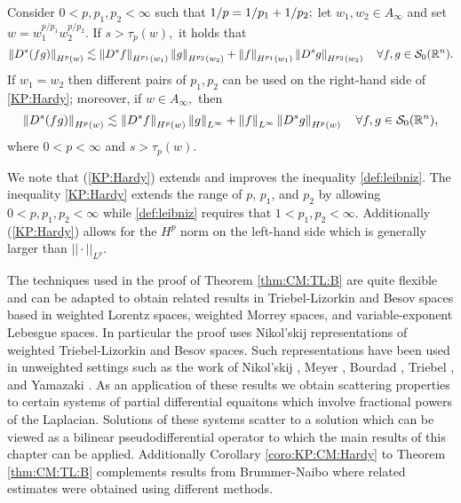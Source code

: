 \begin{corollary}\label{coro:KP:Hardy} 
Consider  $0 < p, p_1, p_2  < \infty$  such that $1/p=1/p_1+1/p_2;$ let  $w_1,w_2\in A_\infty$ and set $w=w_1^{{p}/{p_1}} w_2^{{p}/{p_2}}.$ 
If  $s > \tau_{p}(w),$ it holds that
\begin{equation}\label{KP:Hardy}
\left\|D^s(fg)\right\|_{H^p(w)} \lesssim \left\|D^s f\right\|_{H^{p_1}(w_1)} \left\|g\right\|_{H^{p_2}(w_2)} +  \left\|f\right\|_{H^{p_1}(w_1)}   \left\|D^s g\right\|_{H^{p_2}(w_2)} \quad \forall f, g \in {\mathcal{S}_0}({{\mathbb R}^n}).
\end{equation}
If $w_1=w_2$ then different pairs of $p_1, p_2$ can be used on the right-hand side of \eqref{KP:Hardy}; moreover, if $w\in A_\infty,$ then 
\begin{equation*}
\left\|D^s(fg)\right\|_{H^p(w)} \lesssim \left\|D^s f\right\|_{H^{p}(w)} \left\|g\right\|_{L^\infty} +  \left\|f\right\|_{L^\infty}   \left\|D^s g\right\|_{H^{p}(w)} \quad \forall f, g \in {\mathcal{S}_0}({{\mathbb R}^n}),
\end{equation*}
where $0<p<\infty$ and $s>\tau_{p}(w).$
\end{corollary}

  We note that (\ref{KP:Hardy}) extends and improves the inequality \eqref{def:leibniz}. The inequality \eqref{KP:Hardy} extends the range of $p$, $p_1$, and $p_2$ by allowing $0<p,p_1,p_2<\infty$ while \eqref{def:leibniz} requires that $1<p_1,p_2<\infty$. Additionally (\ref{KP:Hardy}) allows for the $H^p$ norm on the left-hand side which is generally larger than $||\cdot||_{L^p}$. 
  
The techniques used in the proof of Theorem \ref{thm:CM:TL:B} are quite flexible and can be adapted to obtain related results in Triebel-Lizorkin and Besov spaces based in weighted Lorentz spaces, weighted Morrey spaces, and variable-exponent Lebesgue spaces.
In particular the proof uses Nikol'skij representations of weighted Triebel-Lizorkin and Besov spaces. Such representations have been used in unweighted settings such as the work of Nikol'skij \citep{MR0374877}, Meyer \citep{MR639462}, Bourdad \citep{MR673825}, Triebel \citep{MR3024598}, and Yamazaki \citep{MR837335}. As an application of these results we obtain scattering properties to certain systems of partial differential equaitons which involve fractional powers of the Laplacian. Solutions of these systems scatter to a solution which can be viewed as a bilinear pseudodifferential operator to which the main results of this chapter can be applied. Additionally Corollary \ref{coro:KP:CM:Hardy} to Theorem \ref{thm:CM:TL:B} complements results from Brummer-Naibo \citep{BrNa2017} where related estimates were obtained using different methods.

